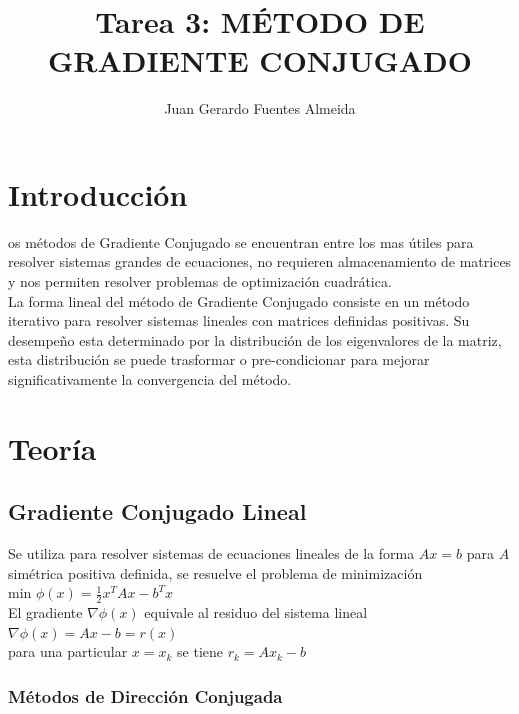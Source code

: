 \documentclass[10pt,journal,compsoc]{styles/IEEEtran}
\title{Tarea 3: MÉTODO DE GRADIENTE CONJUGADO}
\author{Juan Gerardo Fuentes Almeida}
\begin{document}
\maketitle

\IEEEdisplaynontitleabstractindextext

\IEEEpeerreviewmaketitle

\section{Introducci\'on}

os métodos de Gradiente Conjugado se encuentran entre los mas útiles para resolver sistemas grandes de ecuaciones, no requieren almacenamiento de matrices y nos permiten resolver problemas de optimización cuadrática.\\

La forma lineal del método de Gradiente Conjugado consiste en un método iterativo para resolver sistemas lineales con matrices definidas positivas. Su desempeño esta determinado por la distribución de los eigenvalores de la matriz, esta distribución se puede trasformar o pre-condicionar para mejorar significativamente la convergencia del método.
 
\section{Teoría}

\subsection{Gradiente Conjugado Lineal}

Se utiliza para resolver sistemas de ecuaciones lineales de la forma $Ax=b$ para $A$ simétrica positiva definida, se resuelve el problema de minimización\\

min $\phi (x)=\frac{1}{2} x^T A x-b^T x$\\

El gradiente $\nabla \phi(x)$ equivale al residuo del sistema lineal\\

$\nabla \phi (x) = Ax-b = r(x)$\\

para una particular $x=x_k$ se tiene $r_k=Ax_k-b$\\

\subsubsection{Métodos de Dirección Conjugada}
\end{document}
